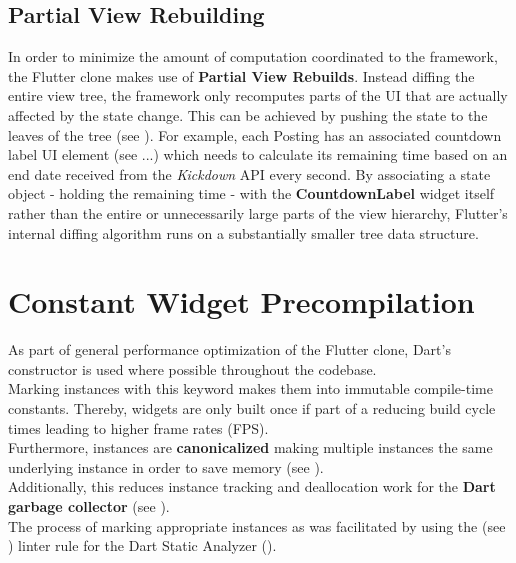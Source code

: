 \subsection{Partial View Rebuilding}
In order to minimize the amount of computation coordinated to the framework, the Flutter clone makes use of \textbf{Partial View Rebuilds}. 
Instead diffing the entire view tree, the framework only recomputes parts of the UI that are actually affected by the state change. 
This can be achieved by pushing the state to the leaves of the tree (see \cite{StatefulWidgetPerformance2021}).
For example, each Posting has an associated countdown label UI element (see ...) which needs to calculate its remaining time based on an end date received from the \textit{Kickdown} API every second.
By associating a state object - holding the remaining time - with the \textbf{CountdownLabel} widget itself rather than the entire or unnecessarily large parts of the view hierarchy, Flutter's internal diffing algorithm runs on a substantially smaller tree data structure.

\section{Constant Widget Precompilation} \label{section::constant_widget_precompilation}
As part of general performance optimization of the Flutter clone, Dart's  constructor is used where possible throughout the codebase.\\
Marking instances with this keyword makes them into immutable compile-time constants.
Thereby,  widgets are only built once if part of a  reducing build cycle times leading to higher frame rates (FPS).\\
Furthermore, instances are \textbf{canonicalized} making multiple instances the same underlying instance in order to save memory (see \cite{DartConstDocumentation}).\\
Additionally, this reduces instance tracking and deallocation work for the \textbf{Dart garbage collector} (see \cite{DartGarbageCollector2021}).\\
The process of marking appropriate instances as  was facilitated by using the  (see \cite{ConstLinterRule2021}) linter rule for the Dart Static Analyzer (\cite{DartCodeAnalysis2021}). 



